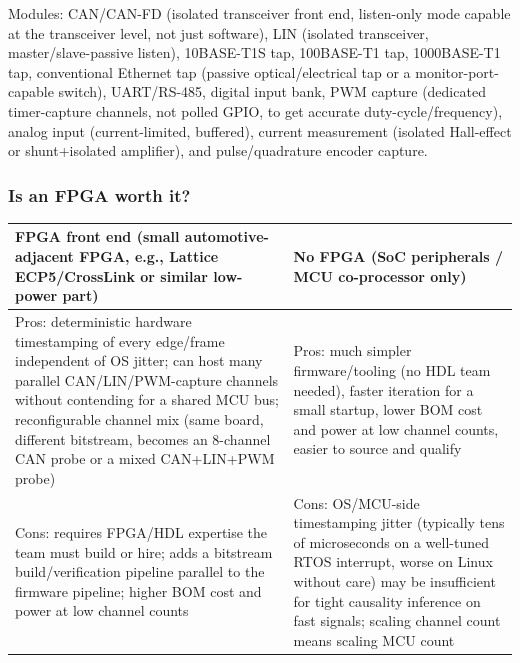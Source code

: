 Modules: CAN/CAN-FD (isolated transceiver front end, listen-only mode capable at the transceiver level, not just software), LIN (isolated transceiver, master/slave-passive listen), 10BASE-T1S tap, 100BASE-T1 tap, 1000BASE-T1 tap, conventional Ethernet tap (passive optical/electrical tap or a monitor-port-capable switch), UART/RS-485, digital input bank, PWM capture (dedicated timer-capture channels, not polled GPIO, to get accurate duty-cycle/frequency), analog input (current-limited, buffered), current measurement (isolated Hall-effect or shunt+isolated amplifier), and pulse/quadrature encoder capture.

\subsubsection{Is an FPGA worth it?}

\begin{center}
\small
\begin{tabularx}{\linewidth}{@{}X X@{}}
\toprule
\textbf{FPGA front end (small automotive-adjacent FPGA, e.g., Lattice ECP5/CrossLink or similar low-power part)} & \textbf{No FPGA (SoC peripherals / MCU co-processor only)} \\
\midrule
Pros: deterministic hardware timestamping of every edge/frame independent of OS jitter; can host many parallel CAN/LIN/PWM-capture channels without contending for a shared MCU bus; reconfigurable channel mix (same board, different bitstream, becomes an 8-channel CAN probe or a mixed CAN+LIN+PWM probe) & Pros: much simpler firmware/tooling (no HDL team needed), faster iteration for a small startup, lower BOM cost and power at low channel counts, easier to source and qualify \\
Cons: requires FPGA/HDL expertise the team must build or hire; adds a bitstream build/verification pipeline parallel to the firmware pipeline; higher BOM cost and power at low channel counts & Cons: OS/MCU-side timestamping jitter (typically tens of microseconds on a well-tuned RTOS interrupt, worse on Linux without care) may be insufficient for tight causality inference on fast signals; scaling channel count means scaling MCU count \\
\bottomrule
\end{tabularx}
\end{center}

